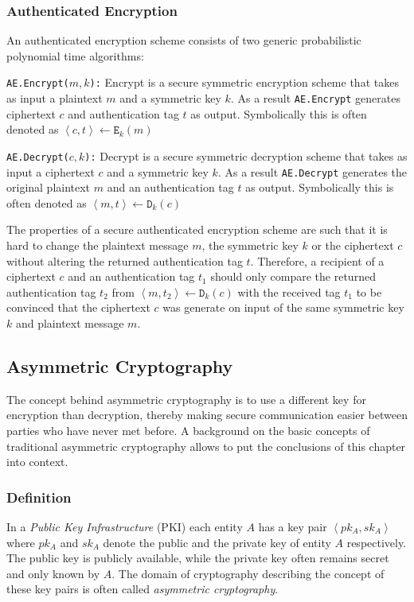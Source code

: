 \subsubsection{Authenticated Encryption}
\label{sec:authenticated_encryption}
An authenticated encryption scheme consists of two generic probabilistic polynomial time algorithms:

\begin{description}
 \item \texttt{AE.Encrypt($m, k$):} Encrypt is a secure symmetric encryption scheme that takes as input a plaintext $m$ and a symmetric key $k$. As a result \texttt{AE.Encrypt} generates ciphertext $c$ and authentication tag $t$ as output. Symbolically this is often denoted as  $\left< c, t \right> \leftarrow \mathtt{E}_k(m)$
 \item \texttt{AE.Decrypt($c, k$):} Decrypt is a secure symmetric decryption scheme that takes as input a ciphertext $c$ and a symmetric key $k$. As a result \texttt{AE.Decrypt} generates the original plaintext $m$ and an authentication tag $t$ as output. Symbolically this is often denoted as $\left< m, t \right> \leftarrow \mathtt{D}_k(c)$
\end{description}

The properties of a secure authenticated encryption scheme are such that it is hard to change the plaintext message $m$, the symmetric key $k$ or the ciphertext $c$ without altering the returned authentication tag $t$. Therefore, a recipient of a ciphertext $c$ and an authentication tag $t_1$ should only compare the returned authentication tag $t_2$ from $\left< m, t_2 \right> \leftarrow \mathtt{D}_k(c)$ with the received tag $t_1$ to be convinced that the ciphertext $c$ was generate on input of the same symmetric key $k$ and plaintext message $m$.

\subsection{Asymmetric Cryptography}
\label{sec:asymmetric_cryptography}
The concept behind asymmetric cryptography is to use a different key for encryption than decryption, thereby making secure communication easier between parties who have never met before. A background on the basic concepts of traditional asymmetric cryptography allows to put the conclusions of this chapter into context.

\subsubsection{Definition}
In a \textit{Public Key Infrastructure} (PKI) each entity $A$ has a key pair $\left< pk_A, sk_A \right>$ where $pk_A$ and $sk_A$ denote the public and the private key of entity $A$ respectively. The public key is publicly available, while the private key often remains secret and only known by $A$. The domain of cryptography describing the concept of these key pairs is often called \textit{asymmetric cryptography}. 

